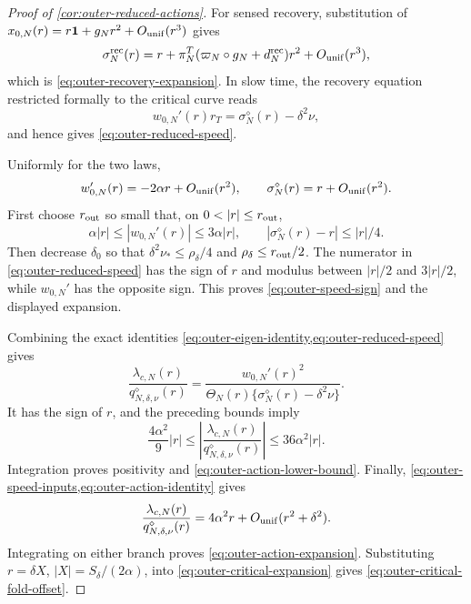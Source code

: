 \begin{proof}[Proof of \cref{cor:outer-reduced-actions}]
For sensed
recovery, substitution of
\(x_{0,N}(r)=r\mathbf1+g_Nr^2+O_{\rm unif}(r^3)\) gives
\begin{equation*}
 \sigma_N^{\rm rec}(r)
 =r+\pi_N^T(\varpi_N\circ g_N+d_N^{\rm rec})r^2+O_{\rm unif}(r^3),
\end{equation*}
which is \cref{eq:outer-recovery-expansion}.  In slow time, the recovery
equation restricted formally to the critical curve reads
\begin{equation*}
 w_{0,N}'(r)r_T=\sigma_N^\diamond(r)-\delta^2\nu,
\end{equation*}
and hence gives \cref{eq:outer-reduced-speed}.

Uniformly for the two laws,
\begin{equation}
 w_{0,N}'(r)=-2\alpha r+O_{\rm unif}(r^2),\qquad
 \sigma_N^\diamond(r)=r+O_{\rm unif}(r^2).         \label{eq:outer-speed-inputs}
\end{equation}
First choose \(r_{\rm out}\) so small that, on
\(0<|r|\le r_{\rm out}\),
\begin{equation*}
 \alpha|r|\le|w_{0,N}'(r)|\le3\alpha|r|,
 \qquad
 |\sigma_N^\diamond(r)-r|\le|r|/4.
\end{equation*}
Then decrease \(\delta_0\) so that
\(\delta^2\nu_*\le\rho_\delta/4\) and
\(\rho_\delta\le r_{\rm out}/2\).  The numerator in
\cref{eq:outer-reduced-speed} has the sign of \(r\) and modulus between
\(|r|/2\) and \(3|r|/2\), while \(w_{0,N}'\) has the opposite sign.
This proves \cref{eq:outer-speed-sign} and the displayed expansion.

Combining the exact identities
\cref{eq:outer-eigen-identity,eq:outer-reduced-speed} gives
\begin{equation}
 \frac{\lambda_{c,N}(r)}{q^\diamond_{N,\delta,\nu}(r)}
 =\frac{w_{0,N}'(r)^2}
  {\Theta_N(r)\{\sigma_N^\diamond(r)-\delta^2\nu\}}.          \label{eq:outer-action-identity}
\end{equation}
It has the sign of \(r\), and the preceding bounds imply
\begin{equation}
 \frac{4\alpha^2}{9}|r|
 \le\left|\frac{\lambda_{c,N}(r)}
                 {q^\diamond_{N,\delta,\nu}(r)}\right|
 \le36\alpha^2|r|.                                  \label{eq:outer-action-integrand-bounds}
\end{equation}
Integration proves positivity and
\cref{eq:outer-action-lower-bound}.  Finally,
\cref{eq:outer-speed-inputs,eq:outer-action-identity} gives
\begin{equation*}
 \frac{\lambda_{c,N}(r)}{q^\diamond_{N,\delta,\nu}(r)}
 =4\alpha^2r+O_{\rm unif}(r^2+\delta^2).
\end{equation*}
Integrating on either branch proves
\cref{eq:outer-action-expansion}.  Substituting
\(r=\delta X\), \(|X|=S_\delta/(2\alpha)\), into
\cref{eq:outer-critical-expansion} gives
\cref{eq:outer-critical-fold-offset}.
\end{proof}

